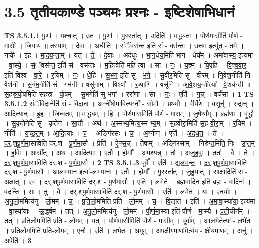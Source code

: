 \documentclass[17pt]{extarticle}
\begin{document}
\section*{ 3.5      तृतीयकाण्डे पञ्चमः प्रश्नः - इष्टिशेषाभिधानं }
                                \textbf{ TS 3.5.1.1} \newline
                  पू॒र्णा । प॒श्चात् । उ॒त । पू॒र्णा । पु॒रस्ता᳚त् । उदिति॑ । म॒द्ध्य॒तः । पौ॒र्ण॒मा॒सीति॑ पौर्ण - मा॒सी । जि॒गा॒य॒ ॥ तस्या᳚म् । दे॒वाः । अधीति॑ । सं॒ॅवस॑न्त॒ इति॑ सं - वस॑न्तः । उ॒त्त॒म इत्यु॑त् - त॒मे । नाके᳚ । इ॒ह । मा॒द॒य॒न्ता॒म् ॥ यत् । ते॒ । दे॒वाः । अद॑धुः । भा॒ग॒धेय॒मिति॑ भाग - धेय᳚म् । अमा॑वास्य॒ इत्यमा᳚ - वा॒स्ये॒ । सं॒ॅवस॑न्त॒ इति॑ सं - वस॑न्तः । म॒हि॒त्वेति॑ महि-त्वा ॥ सा । नः॒ । य॒ज्ञ्म् । पि॒पृ॒हि॒ । वि॒श्व॒वा॒र॒ इति॑ विश्व - वा॒रे॒ । र॒यिम् । नः॒ । धे॒हि॒ । सु॒भ॒ग॒ इति॑ सु - भ॒गे॒ । सु॒वीर॒मिति॑ सु - वीर᳚म् ॥ नि॒वेश॒नीति॑ नि - वेश॑नी । स॒गंम॒नीति॑ सं - गम॑नी । वसू॑नाम् । विश्वा᳚ । रू॒पाणि॑ । वसू॑नि । आ॒वे॒शय॒न्तीत्या᳚ - वे॒शय॑न्ती ॥ स॒ह॒स्र॒पो॒षमिति॑ सहस्र - पो॒षम् । सु॒भगेति॑ सु-भगा᳚ । ररा॑णा । सा । नः॒ । एति॑ । ग॒न्न् । वर्च॑सा । \textbf{  1} \newline
                  \newline
                                \textbf{ TS 3.5.1.2} \newline
                  सं॒ॅवि॒दा॒नेति॑ सं - वि॒दा॒ना ॥ अग्नी॑षोमा॒वित्यग्नी᳚ - सो॒मौ॒ । प्र॒थ॒मौ । वी॒र्ये॑ण । वसून्॑ । रु॒द्रान् । आ॒दि॒त्यान् । इ॒ह । जि॒न्व॒त॒म् ॥ मा॒द्ध्यम् । हि । पौ॒र्ण॒मा॒समिति॑ पौर्ण - मा॒सम् । जु॒षेथा᳚म् । ब्रह्म॑णा । वृ॒द्धौ । सु॒कृ॒तेनेति॑ सु - कृ॒तेन॑ । सा॒तौ । अथ॑ । अ॒स्मभ्य॒मित्य॒स्म-भ्य॒म् । स॒हवी॑रा॒मिति॑ स॒ह-वी॒रा॒म् । र॒यिम् । नीति॑ । य॒च्छ॒त॒म् ॥ आ॒दि॒त्याः । च॒ । अङ्गि॑रसः । च॒ । अ॒ग्नीन् । एति॑ । अ॒द॒ध॒त॒ । ते । द॒र्॒.श॒पू॒र्ण॒मा॒साविति॑ दर्.श - पू॒र्ण॒मा॒सौ । प्रेति॑ । ऐ॒फ्स॒न्न् । तेषा᳚म् । अङ्गि॑रसाम् । निरु॑प्त॒मिति॒ निः - उ॒प्त॒म् । ह॒विः । आसी᳚त् । अथ॑ । आ॒दि॒त्याः । ए॒तौ । होमौ᳚ । अ॒प॒श्य॒न्न् । तौ । अ॒जु॒ह॒वुः॒ । ततः॑ । वै । ते । द॒र्॒.श॒पू॒र्ण॒मा॒साविति॑ दर्.श - पू॒र्ण॒मा॒सौ । \textbf{  2} \newline
                  \newline
                                \textbf{ TS 3.5.1.3} \newline
                  पूर्वे᳚ । एति॑ । अ॒ल॒भ॒न्त॒ । द॒र्॒.श॒पू॒र्ण॒मा॒साविति॑ दर्.श - पू॒र्ण॒मा॒सौ । आ॒लभ॑मान॒ इत्या᳚-लभ॑मानः । ए॒तौ । होमौ᳚ । पु॒रस्ता᳚त् । जु॒हु॒या॒त् । सा॒क्षादिति॑ स - अ॒क्षात् । ए॒व । द॒र्॒.श॒पू॒र्ण॒मा॒साविति॑ दर्.श - पू॒र्ण॒मा॒सौ । एति॑ । ल॒भे॒ते॒ । ब्र॒ह्म॒वा॒दिन॒ इति॑ ब्रह्म - वा॒दिनः॑ । व॒द॒न्ति॒ । सः । तु । वै । द॒र्॒.श॒पू॒र्ण॒मा॒साविति॑ दर्.श - पू॒र्ण॒मा॒सौ । एति॑ । ल॒भे॒त॒ । यः । ए॒न॒योः॒ । अ॒नु॒लो॒ममित्य॑नु - लो॒मम् । च॒ । प्र॒ति॒लो॒ममिति॑ प्रति - लो॒मम् । च॒ । वि॒द्यात् । इति॑ । अ॒मा॒वा॒स्या॑या॒ इत्य॑मा - वा॒स्या॑याः । ऊ॒र्द्ध्वम् । तत् । अ॒नु॒लो॒ममित्य॑नु - लो॒मम् । पौ॒र्ण॒मा॒स्या इति॑ पौर्ण - मा॒स्यै । प्र॒ती॒चीन᳚म् । तत् । प्र॒ति॒लो॒ममिति॑ प्रति - लो॒मम् । यत् । पौ॒र्ण॒मा॒सीमिति॑ पौर्ण - मा॒सीम् । पूर्वा᳚म् । आ॒लभे॒तेत्या᳚ - लभे॑त । प्र॒ति॒लो॒ममिति॑ प्रति-लो॒मम् । ए॒नौ॒ । एति॑ । ल॒भे॒त॒ । अ॒मुम् । अ॒प॒क्षीय॑माण॒मित्य॑प - क्षीय॑माणम् । अनु॑ । अपेति॑ । \textbf{  3} \newline
\end{document}
